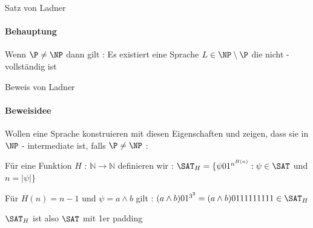 \begin{frame}{Satz von Ladner}
	\framesubtitle{Behauptung}
	\begin{Satz}
	Wenn $\P \neq \NP$ dann gilt : \newline
	Es existiert eine Sprache $L \in \NP \setminus \P$ die nicht \NP -vollständig ist
	\end{Satz}
\end{frame}
\begin{frame}{Beweis von Ladner}
	\framesubtitle{Beweisidee}
	Wollen eine Sprache konstruieren mit diesen Eigenschaften und zeigen, dass sie in $\NP$ - intermediate ist, falls $\P \neq \NP$  :
	\pause
	\begin{KITinfoblock}{}
	\begin{Definition}
		Für eine Funktion $H$ : $\mathbb{N} \rightarrow \mathbb{N}$ definieren wir : \newline 	
		${\SAT}_H = \lbrace \psi 01^{n^{H(n)}} : \psi \in \SAT$ und $ n = |\psi| \rbrace$
	\end{Definition}
	\end{KITinfoblock}

	\pause	
	
	\begin{Beispiel}
	Für $H(n) = n - 1$ und $\psi = a \land b$ gilt : \newline
	$(a \land b) 01^{3^2} = (a \land b) 0111111111 \in {\SAT}_H $
	\end{Beispiel}
	\pause
	${\SAT}_H$ ist also $\SAT$ mit 1er padding
\end{frame}

